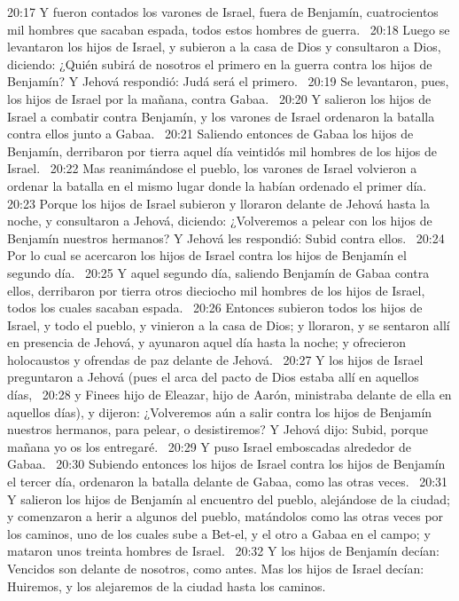 20:17 Y fueron contados los varones de Israel, fuera de Benjamín, cuatrocientos mil hombres que sacaban espada, todos estos hombres de guerra.  
20:18 Luego se levantaron los hijos de Israel, y subieron a la casa de Dios y consultaron a Dios, diciendo: ¿Quién subirá de nosotros el primero en la guerra contra los hijos de Benjamín? Y Jehová respondió: Judá será el primero.  
20:19 Se levantaron, pues, los hijos de Israel por la mañana, contra Gabaa.  
20:20 Y salieron los hijos de Israel a combatir contra Benjamín, y los varones de Israel ordenaron la batalla contra ellos junto a Gabaa.  
20:21 Saliendo entonces de Gabaa los hijos de Benjamín, derribaron por tierra aquel día veintidós mil hombres de los hijos de Israel.  
20:22 Mas reanimándose el pueblo, los varones de Israel volvieron a ordenar la batalla en el mismo lugar donde la habían ordenado el primer día.  
20:23 Porque los hijos de Israel subieron y lloraron delante de Jehová hasta la noche, y consultaron a Jehová, diciendo: ¿Volveremos a pelear con los hijos de Benjamín nuestros hermanos? Y Jehová les respondió: Subid contra ellos.  
20:24 Por lo cual se acercaron los hijos de Israel contra los hijos de Benjamín el segundo día.  
20:25 Y aquel segundo día, saliendo Benjamín de Gabaa contra ellos, derribaron por tierra otros dieciocho mil hombres de los hijos de Israel, todos los cuales sacaban espada.  
20:26 Entonces subieron todos los hijos de Israel, y todo el pueblo, y vinieron a la casa de Dios; y lloraron, y se sentaron allí en presencia de Jehová, y ayunaron aquel día hasta la noche; y ofrecieron holocaustos y ofrendas de paz delante de Jehová.  
20:27 Y los hijos de Israel preguntaron a Jehová (pues el arca del pacto de Dios estaba allí en aquellos días,  
20:28 y Finees hijo de Eleazar, hijo de Aarón, ministraba delante de ella en aquellos días), y dijeron: ¿Volveremos aún a salir contra los hijos de Benjamín nuestros hermanos, para pelear, o desistiremos? Y Jehová dijo: Subid, porque mañana yo os los entregaré.  
20:29 Y puso Israel emboscadas alrededor de Gabaa.  
20:30 Subiendo entonces los hijos de Israel contra los hijos de Benjamín el tercer día, ordenaron la batalla delante de Gabaa, como las otras veces.  
20:31 Y salieron los hijos de Benjamín al encuentro del pueblo, alejándose de la ciudad; y comenzaron a herir a algunos del pueblo, matándolos como las otras veces por los caminos, uno de los cuales sube a Bet-el, y el otro a Gabaa en el campo; y mataron unos treinta hombres de Israel.  
20:32 Y los hijos de Benjamín decían: Vencidos son delante de nosotros, como antes. Mas los hijos de Israel decían: Huiremos, y los alejaremos de la ciudad hasta los caminos.  
